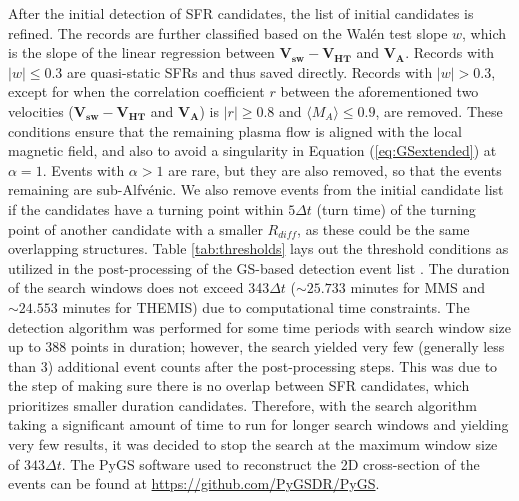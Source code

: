 After the initial detection of SFR candidates, the list of initial candidates is refined. The records are further classified based on the Wal\'en test slope $w$, which is the slope of the linear regression between $\mathbf{V_{sw}} - \mathbf{V_{HT}}$ and $\mathbf{V_A}$. Records with $|w|\leq0.3$ are quasi-static SFRs and thus saved directly. Records with $|w|>0.3$, except for when the correlation coefficient $r$ between the aforementioned two velocities ($\mathbf{V_{sw}} - \mathbf{V_{HT}}$ and $\mathbf{V_A}$) is $|r|\geq 0.8$ and $\langle M_A\rangle \leq 0.9$, are removed. These conditions ensure that the remaining plasma flow is aligned with the local magnetic field, and also to avoid a singularity in Equation (\ref{eq:GSextended}) at $\alpha=1$. Events with $\alpha>1$ are rare, but they are also removed, so that the events remaining are sub-Alfv\'enic. We also remove events from the initial candidate list if the candidates have a turning point within $5\Delta t$ (turn time) of the turning point of another candidate with a smaller $R_{diff}$, as these could be the same overlapping structures. Table \ref{tab:thresholds} lays out the threshold conditions as utilized in the post-processing of the GS-based detection event list \citep{Chen:2020, Chen:2021, Chen:2022}. The duration of the search windows does not exceed 343$\Delta t$ ($\sim 25.733$ minutes for MMS and $\sim 24.553$ minutes for THEMIS) due to computational time constraints. The detection algorithm was performed for some time periods with search window size up to 388 points in duration; however, the search yielded very few (generally less than 3) additional event counts after the post-processing steps. This was due to the step of making sure there is no overlap between SFR candidates, which prioritizes smaller duration candidates. Therefore, with the search algorithm taking a significant amount of time to run for longer search windows and yielding very few results, it was decided to stop the search at the maximum window size of $343\Delta t$. The PyGS software used to reconstruct the 2D cross-section of the events can be found at \url{https://github.com/PyGSDR/PyGS}.


